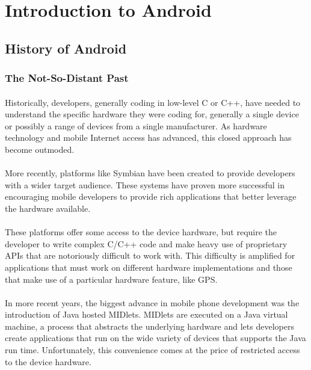 \section{Introduction to Android}
\subsection{History of Android}
\subsubsection{The Not-So-Distant Past}

\paragraph{}
Historically, developers, generally coding in low-level C or C++, have needed to understand the specific hardware they were coding for, generally a single device or possibly a range of devices from a single manufacturer. As hardware technology and mobile Internet access has advanced, this closed approach has become outmoded.

\paragraph{}
More recently, platforms like Symbian have been created to provide developers with a wider target audience. These systems have proven more successful in encouraging mobile developers to provide rich applications that better leverage the hardware available.

\paragraph{}
These platforms offer some access to the device hardware, but require the developer to write complex C/C++ code and make heavy use of proprietary APIs that are notoriously difficult to work with. This difficulty is amplified for applications that must work on different hardware implementations and those that make use of a particular hardware feature, like GPS.

\paragraph{}
In more recent years, the biggest advance in mobile phone development was the introduction of Java hosted MIDlets. MIDlets are executed on a Java virtual machine, a process that abstracts the underlying hardware and lets developers create applications that run on the wide variety of devices that supports the Java run time. Unfortunately, this convenience comes at the price of restricted access to the device hardware.

